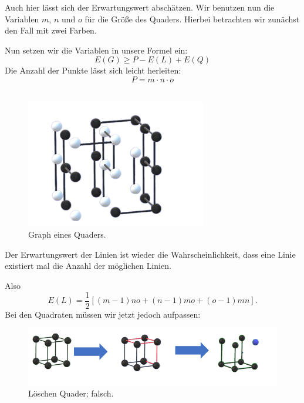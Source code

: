 \documentclass[11pt,a4paper]{article}
\numberwithin{equation}{section}
\numberwithin{table}{section}
\numberwithin{figure}{section}
\begin{document}
\noindent\begin{minipage}{0.6\textwidth}
\noindent Auch hier lässt sich der Erwartungswert abschätzen. Wir benutzen nun die Variablen $m$, $n$ und $o$ für die Größe des Quaders. Hierbei betrachten wir zunächst den Fall mit zwei Farben.\par\noindent
Nun setzen wir die Variablen in unsere Formel ein:
$$E(G)\geq P-E(L)+E(Q)$$
Die Anzahl der Punkte lässt sich leicht herleiten:
$$P=m\cdot n\cdot o$$
\\
\end{minipage}
\begin{minipage}{0.4\textwidth}
\begin{figure}[H]\label{bild5}
\begin{center}
\includegraphics[scale=0.7]{Bild267.png}
\caption{Graph eines Quaders.}
\end{center}
\end{figure} 
\end{minipage}
Der Erwartungswert der Linien ist wieder die Wahrscheinlichkeit, dass eine Linie existiert mal die Anzahl der möglichen Linien. \par\noindent
Also  
$$E(L)=\frac{1}{2}[(m-1)no+(n-1)mo+(o-1)mn].$$
Bei den Quadraten müssen wir jetzt jedoch aufpassen:
\vspace{-2em}
\begin{center}
\begin{figure}[H]\label{bild6}
\begin{center}\includegraphics[scale=0.9]{6.png}
\caption{Löschen Quader; falsch.}\end{center}
\end{figure}
\end{center}
\end{document}
